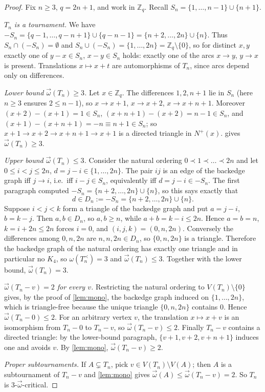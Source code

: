 \documentclass[11pt,a4paper]{article}
\theoremstyle{plain}
\theoremstyle{definition}
\theoremstyle{remark}
\newcommand{\cl}{\overrightarrow{\omega}}
\newcommand{\Z}{\mathbb Z}
\begin{document}
\label{pf:main}
\thmmain*
\begin{proof}
Fix $n\ge3$, $q=2n+1$, and work in $\Z_q$. Recall $S_n=\{1,\dots,n-1\}\cup\{n+1\}$.

\emph{$T_n$ is a tournament.} We have $-S_n=\{q-1,\dots,q-n+1\}\cup\{q-n-1\}=\{n+2,\dots,2n\}\cup\{n\}$. Thus $S_n\cap(-S_n)=\emptyset$ and $S_n\cup(-S_n)=\{1,\dots,2n\}=\Z_q\setminus\{0\}$, so for distinct $x,y$ exactly one of $y-x\in S_n$, $x-y\in S_n$ holds: exactly one of the arcs $x\to y$, $y\to x$ is present. Translations $x\mapsto x+t$ are automorphisms of $T_n$, since arcs depend only on differences.

\emph{Lower bound $\cl(T_n)\ge3$.} Let $x\in\Z_q$. The differences $1,2,n+1$ lie in $S_n$ (here $n\ge3$ ensures $2\le n-1$), so $x\to x+1$, $x\to x+2$, $x\to x+n+1$. Moreover $(x+2)-(x+1)=1\in S_n$, $(x+n+1)-(x+2)=n-1\in S_n$, and $(x+1)-(x+n+1)=-n\equiv n+1\in S_n$; so $x+1\to x+2\to x+n+1\to x+1$ is a directed triangle in $N^+(x)$.  gives $\cl(T_n)\ge3$.

\emph{Upper bound $\cl(T_n)\le3$.} Consider the natural ordering $0\prec1\prec\dots\prec2n$ and let $0\le i<j\le2n$, $d=j-i\in\{1,\dots,2n\}$. The pair $ij$ is an edge of the backedge graph iff $j\to i$, i.e.\ iff $i-j\in S_n$, equivalently iff $d=j-i\in-S_n$. The first paragraph computed $-S_n=\{n+2,\dots,2n\}\cup\{n\}$, so this says exactly that
\[
 d\in D_n:=-S_n=\{n+2,\dots,2n\}\cup\{n\}.
\]
Suppose $i<j<k$ form a triangle of the backedge graph and put $a=j-i$, $b=k-j$. Then $a,b\in D_n$, so $a,b\ge n$, while $a+b=k-i\le2n$. Hence $a=b=n$, $k=i+2n\le2n$ forces $i=0$, and $(i,j,k)=(0,n,2n)$. Conversely the differences among $0,n,2n$ are $n,n,2n\in D_n$, so $\{0,n,2n\}$ is a triangle. Therefore the backedge graph of the natural ordering has exactly one triangle and in particular no $K_4$, so $\omega(T_n^\prec)=3$ and $\cl(T_n)\le3$. Together with the lower bound, $\cl(T_n)=3$.

\emph{$\cl(T_n-v)=2$ for every $v$.} Restricting the natural ordering to $V(T_n)\setminus\{0\}$ gives, by the proof of \cref{lem:mono}, the backedge graph induced on $\{1,\dots,2n\}$, which is triangle-free because the unique triangle $\{0,n,2n\}$ contains $0$. Hence $\cl(T_n-0)\le2$. For an arbitrary vertex $v$, the translation $x\mapsto x+v$ is an isomorphism from $T_n-0$ to $T_n-v$, so $\cl(T_n-v)\le2$. Finally $T_n-v$ contains a directed triangle: by the lower-bound paragraph, $\{v+1,v+2,v+n+1\}$ induces one and avoids $v$. By \cref{lem:mono}, $\cl(T_n-v)\ge2$.

\emph{Proper subtournaments.} If $A\subsetneq T_n$, pick $v\in V(T_n)\setminus V(A)$; then $A$ is a subtournament of $T_n-v$ and \cref{lem:mono} gives $\cl(A)\le\cl(T_n-v)=2$. So $T_n$ is $3$-$\cl$-critical.
\end{proof}
\end{document}
